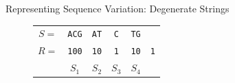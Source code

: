 \begin{frame}{Representing Sequence Variation: Degenerate Strings}
\begin{figure}[h!]
{\begin{tabular}{c@{\hskip 0.5em}c@{\hskip 0.5em}c@{\hskip 0.5em}c@{\hskip 0.5em}c@{\hskip 0.5em}c}
                $S =$  & \texttt{ACG} & \texttt{AT} & \texttt{C} & \texttt{TG} &            \\
                $R = $ & \texttt{100} & \texttt{10} & \texttt{1} & \texttt{10} & \texttt{1} \\
                       & $S_1$        & $S_2$       & $S_3$      & $S_4$
            \end{tabular}
        }
    \end{figure}
\end{frame}
